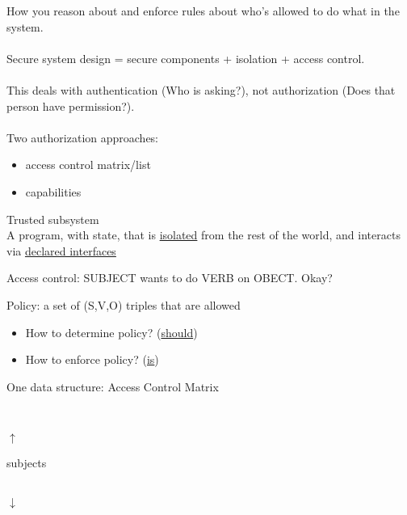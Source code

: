 How you reason about and enforce rules about who's allowed to do what in the
system. 
\\
\\
Secure system design = secure components + isolation + access control.
\\
\\
This deals with authentication (Who is asking?), not authorization (Does that
person have permission?).
\\
\\
Two authorization approaches:
	\begin{itemize}
	\item access control matrix/list
	\item capabilities
	\end{itemize}

\begin{definition}{Trusted subsystem}\\
A program, with state, that is \underline{isolated} from
the rest of the world, and interacts via \underline{declared interfaces}
\end{definition}

Access control: SUBJECT wants to do VERB on OBECT. Okay?

Policy: a set of (S,V,O) triples that are allowed
\begin{itemize}
    \item How to determine policy? (\underline{should})
    \item How to enforce policy? (\underline{is})
\end{itemize}
One data structure: Access Control Matrix\\
\parbox[c]{5cm}{\\
\parbox[c]{1cm}{$\uparrow$\\
\begin{sideways}subjects\end{sideways}\\
$\downarrow$}
\makebox[.5cm]{}
}


